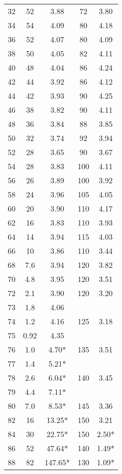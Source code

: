 \begin{table}
\begin{longtable}{S[table-format = 2.0] | c S[table-format = 3.2] | c S[table-format = 1.2]}
        32 & 52  &   3.88  & 72  & 3.80  \\
        34 & 54  &   4.09  & 80  & 4.18  \\
        36 & 52  &   4.07  & 80  & 4.09  \\
        38 & 50  &   4.05  & 82  & 4.11  \\
        40 & 48  &   4.04  & 86  & 4.24  \\
        42 & 44  &   3.92  & 86  & 4.12  \\
        44 & 42  &   3.93  & 90  & 4.25  \\
        46 & 38  &   3.82  & 90  & 4.11  \\
        48 & 36  &   3.84  & 88  & 3.85  \\
        50 & 32  &   3.74  & 92  & 3.94  \\
        52 & 28  &   3.65  & 90  & 3.67  \\
        54 & 28  &   3.83  & 100 & 4.11  \\
        56 & 26  &   3.89  & 100 & 3.92  \\
        58 & 24  &   3.96  & 105 & 4.05  \\
        60 & 20  &   3.90  & 110 & 4.17  \\
        62 & 16  &   3.83  & 110 & 3.93  \\
        64 & 14  &   3.94  & 115 & 4.03  \\
        66 & 10  &   3.86  & 110 & 3.44  \\
        68 & 7.6 &   3.94  & 120 & 3.82  \\
        70 & 4.8 &   3.95  & 120 & 3.51  \\
        72 & 2.1 &   3.90  & 120 & 3.20  \\
        73 & 1.8 &   4.06  &     &       \\
        74 & 1.2 &   4.16  & 125 & 3.18  \\
        75 & 0.92&   4.35  &     &       \\
        76 & 1.0 &   4.70* & 135 & 3.51  \\
        77 & 1.4 &   5.21* &     &       \\
        78 & 2.6 &   6.04* & 140 & 3.45  \\
        79 & 4.4 &   7.11* &     &       \\
        80 & 7.0 &   8.53* & 145 & 3.36  \\ 
        82 & 16  &  13.25* & 150 & 3.21  \\     
        84 & 30  &  22.75* & 150 & 2.50* \\    
        86 & 52  &  47.64* & 140 & 1.49* \\    
        88 & 82  & 147.65* & 130 & 1.09* \\    
    \bottomrule
  \end{longtable}
\end{table}

